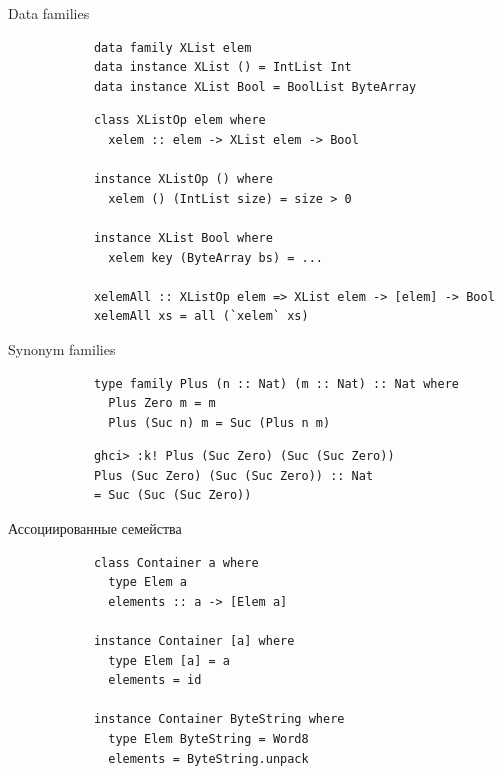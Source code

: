 
    \begin{frame}[fragile]{Data families}
        \pause
        \begin{verbatim}
            data family XList elem
            data instance XList () = IntList Int
            data instance XList Bool = BoolList ByteArray
        \end{verbatim}
        \pause\vspace{1em}
        \begin{verbatim}
            class XListOp elem where
              xelem :: elem -> XList elem -> Bool

            instance XListOp () where
              xelem () (IntList size) = size > 0

            instance XList Bool where
              xelem key (ByteArray bs) = ...

            xelemAll :: XListOp elem => XList elem -> [elem] -> Bool
            xelemAll xs = all (`xelem` xs)
        \end{verbatim}
    \end{frame}

    \begin{frame}[fragile]{Synonym families}
        \pause
        \begin{verbatim}
            type family Plus (n :: Nat) (m :: Nat) :: Nat where
              Plus Zero m = m
              Plus (Suc n) m = Suc (Plus n m)
        \end{verbatim}
        \pause\vspace{1em}
        \begin{verbatim}
            ghci> :k! Plus (Suc Zero) (Suc (Suc Zero))
            Plus (Suc Zero) (Suc (Suc Zero)) :: Nat
            = Suc (Suc (Suc Zero))
        \end{verbatim}
    \end{frame}

    \begin{frame}[fragile]{Ассоциированные семейства}
        \pause
        \begin{verbatim}
            class Container a where
              type Elem a
              elements :: a -> [Elem a]

            instance Container [a] where
              type Elem [a] = a
              elements = id

            instance Container ByteString where
              type Elem ByteString = Word8
              elements = ByteString.unpack
        \end{verbatim}
    \end{frame}

